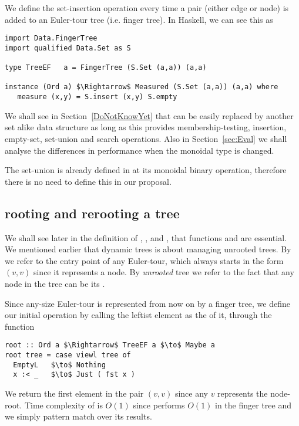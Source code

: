 We define the set-insertion operation every time a pair (either edge or node) is added to an Euler-tour tree (i.e. finger tree). In Haskell, we can see this as
\begin{lstlisting}[mathescape]
import Data.FingerTree
import qualified Data.Set as S

type TreeEF   a = FingerTree (S.Set (a,a)) (a,a)

instance (Ord a) $\Rightarrow$ Measured (S.Set (a,a)) (a,a) where 
   measure (x,y) = S.insert (x,y) S.empty 
\end{lstlisting} 

We shall see in Section~\ref{DoNotKnowYet} that  can be easily replaced by another set alike data structure as long as this provides membership-testing, insertion, empty-set, set-union and search operations. Also in Section~\ref{sec:Eval} we shall analyse the differences in performance when the monoidal type is changed.

The set-union is already defined in  at its monoidal binary operation, therefore there is no need to define this in our proposal.


\subsection{rooting and rerooting a tree}
We shall see later in the definition of \link,  \cut, and \connected, that functions \root and \reroot are essential. We mentioned earlier that dynamic trees is about managing unrooted trees. By \root we refer to the entry point of any Euler-tour, which always starts in the form $(v,v)$ since it represents a node. By \emph{unrooted} tree we refer to the fact that any node in the tree can be its \root.

Since any-size Euler-tour is represented from now on by a finger tree, we define our initial operation by calling the leftist element as the \root of it, through the function 
\begin{lstlisting}[mathescape] 
root :: Ord a $\Rightarrow$ TreeEF a $\to$ Maybe a  
root tree = case viewl tree of
  EmptyL   $\to$ Nothing
  x :< _   $\to$ Just ( fst x )
\end{lstlisting}

We return the first element in the pair $(v,v)$ since any $v$ represents the node-root. Time complexity of \root is $O(1)$ since  performs $O(1)$ in the finger tree and we simply pattern match over its results.

